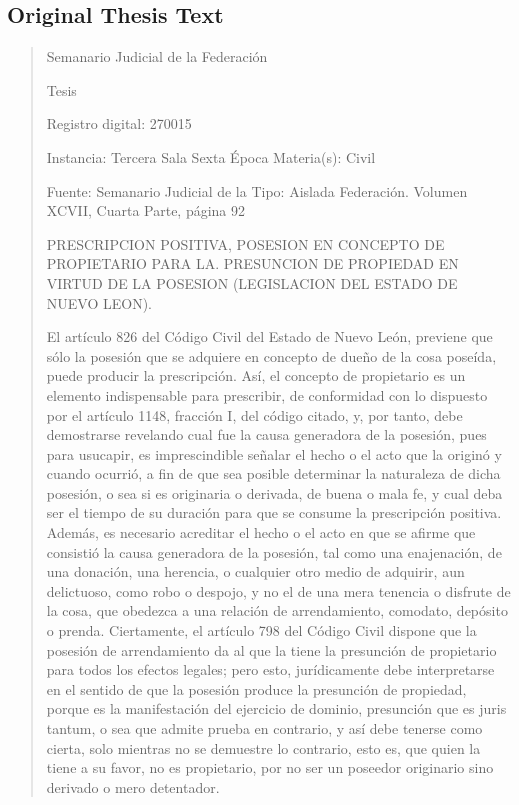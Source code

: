 \documentclass[11pt,a4paper]{article}
\begin{document}
\subsection{Original Thesis Text}

\begin{quote}
                                                   Semanario Judicial de la Federación

                                                  Tesis

 Registro digital: 270015

 Instancia: Tercera Sala          Sexta Época                          Materia(s): Civil

                                  Fuente: Semanario Judicial de la     Tipo: Aislada
                                  Federación.
                                  Volumen XCVII, Cuarta Parte,
                                  página 92


PRESCRIPCION POSITIVA, POSESION EN CONCEPTO DE PROPIETARIO PARA LA.
PRESUNCION DE PROPIEDAD EN VIRTUD DE LA POSESION (LEGISLACION DEL ESTADO DE
NUEVO LEON).


El artículo 826 del Código Civil del Estado de Nuevo León, previene que sólo la posesión que se
adquiere en concepto de dueño de la cosa poseída, puede producir la prescripción. Así, el concepto
de propietario es un elemento indispensable para prescribir, de conformidad con lo dispuesto por el
artículo 1148, fracción I, del código citado, y, por tanto, debe demostrarse revelando cual fue la
causa generadora de la posesión, pues para usucapir, es imprescindible señalar el hecho o el acto
que la originó y cuando ocurrió, a fin de que sea posible determinar la naturaleza de dicha posesión,
o sea si es originaria o derivada, de buena o mala fe, y cual deba ser el tiempo de su duración para
que se consume la prescripción positiva. Además, es necesario acreditar el hecho o el acto en que
se afirme que consistió la causa generadora de la posesión, tal como una enajenación, de una
donación, una herencia, o cualquier otro medio de adquirir, aun delictuoso, como robo o despojo, y
no el de una mera tenencia o disfrute de la cosa, que obedezca a una relación de arrendamiento,
comodato, depósito o prenda. Ciertamente, el artículo 798 del Código Civil dispone que la posesión
de arrendamiento da al que la tiene la presunción de propietario para todos los efectos legales; pero
esto, jurídicamente debe interpretarse en el sentido de que la posesión produce la presunción de
propiedad, porque es la manifestación del ejercicio de dominio, presunción que es juris tantum, o
sea que admite prueba en contrario, y así debe tenerse como cierta, solo mientras no se demuestre
lo contrario, esto es, que quien la tiene a su favor, no es propietario, por no ser un poseedor
originario sino derivado o mero detentador.



\end{quote}
\end{document}

